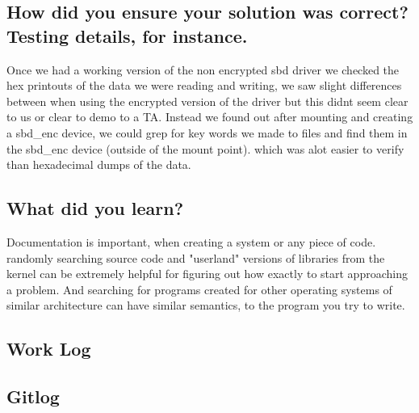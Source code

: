 \documentclass[letterpaper,10pt,titlepage]{IEEEtran}
\begin{document}
\subsection{How did you ensure your solution was correct? Testing details, for instance.} Once we had a working version of the non encrypted sbd driver we checked the hex printouts of the data we were reading and writing, we saw slight differences between when using the encrypted version of the driver but this didnt seem clear to us or clear to demo to a TA. Instead we found out after mounting and creating a sbd\_enc device, we could grep for key words we made to files and find them in the sbd\_enc device (outside of the mount point). which was alot easier to verify than hexadecimal dumps of the data.\\

\subsection{What did you learn?}Documentation is important, when creating a system or any piece of code. randomly searching source code and "userland" versions of libraries from the kernel can be extremely helpful for figuring out how exactly to start approaching a problem. And searching for programs created for other operating systems of similar architecture can have similar semantics, to the program you try to write.\\

\begin{table*}
\section{Work Log}

\end{table*}

\begin{table*}
\section{Gitlog}

\end{table*}

    
\newpage
\nocite{*}%



\end{document}
